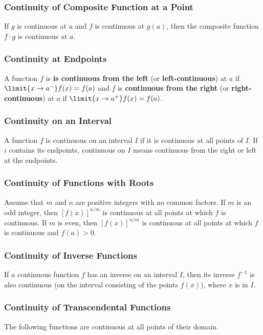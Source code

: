 \subsubsection{Continuity of Composite Function at a Point}
If $g$ is continuous at $a$ and $f$ is continuous at $g(a)$, then the composite function $f \cdot g$ is continuous at $a$.

\subsubsection{Continuity at Endpoints}
A function $f$ is \textbf{is continuous from the left} (or \textbf{left-continuous}) at $a$ if $\limit{x \rightarrow a^-} f(x) = f(a)$ and $f$ is \textbf{continuous from the right} (or \textbf{right-continuous}) at $a$ if $\limit{x \rightarrow a^+} f(x) = f(a)$. 

\subsubsection{Continuity on an Interval}
A function $f$ is continuous on an interval $I$ if it is continuous at all points of $I$. If $i$ contains its endpoints, continuous on $I$ means continuous from the right or left at the endpoints.

\subsubsection{Continuity of Functions with Roots}
Assume that $m$ and $n$ are positive integers with no common factors. If $m$ is an odd integer, then ${[ f(x) ]}^{n/m}$ is continuous at all points at which $f$ is continuous. If $m$ is even, then ${[ f(x) ]}^{n/m}$ is continuous at all points at which $f$ is continuous and $f(a) > 0$.

\subsubsection{Continuity of Inverse Functions}
If $a$ continuous function $f$ has an inverse on an interval $I$, then its inverse $f^{-1}$ is also continuous (on the interval consisting of the points $f(x)$), where $x$ is in $I$. 

\subsubsection{Continuity of Transcendental Functions}
The following functions are continuous at all points of their domain.

